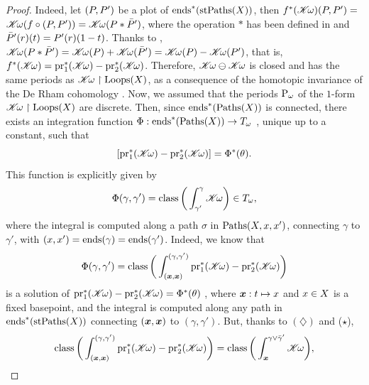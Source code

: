 \begin{proof}
  Indeed,
  let $(\P,\P')$ be a plot of $\ends^*(\stPaths(\X))$,
  then $f^*(\CHK\!\omega)(\P,\P') =$%
  \linebreak%
  $\CHK\!\omega(f\circ(\P,\P')) = \CHK\!\omega(\P * \bar\P')$,
  where the operation $*$ has been defined in  and $\bar\P'(r)(t) = \P'(r)(1-t)$.
  Thanks to ,
  $\CHK\!\omega(\P * \bar\P') = \CHK\!\omega(\P) + \CHK\!\omega(\bar\P') = \CHK\!\omega(\P) - \CHK\!\omega(\P')$,
  that is,
  $f^*(\CHK\!\omega) = \pr_1^*(\CHK\!\omega) - \pr_2^*(\CHK\!\omega)$.
  Therefore,
  $\CHK\!\omega \ominus \CHK\!\omega$ is closed and has the same periods as $\CHK\!\omega \restriction \Loops(\X)$,
  as a consequence of the homotopic invariance of the De Rham cohomology .
  Now,
  we assumed that the periods $\Periods_\omega$ of the $1$-form $\CHK\!\omega \restriction \Loops(\X)$ are discrete.
  Then,
  since $\ends^*(\Paths(\X))$ is connected,
  there exists an integration function $\Phi : \ends^*(\Paths(\X)) \to \T_\omega$ ,
  unique up to a constant,
  such that
  $$%
  \left[\pr_1^*(\CHK\!\omega) - \pr_2^*(\CHK\!\omega)\right] = \Phi^*(\theta).
  $$%
  This function is explicitly given by
  \begin{equation}
    \renewcommand{\theequation}{$\spadesuit$}
    \Phi(\gamma,\gamma') = \class\bigg(\int_{\gamma'}^{\gamma} \CHK\!\omega\bigg) \in \Torus_\omega,
  \end{equation}
  where the integral is computed along a path $\sigma$ in $\Paths(\X,x,x')$,
  connecting $\gamma$ to $\gamma'$, with $(x,x') = \ends(\gamma) = \ends(\gamma')$.
  Indeed, we know that
  $$%
  \Phi(\gamma,\gamma') =
  \class\bigg(\int_{(\bmx, \bmx)}^{(\gamma, \gamma')}
  \pr_1^*(\CHK\!\omega) - \pr_2^*(\CHK\!\omega)\bigg)
  $$%
  is a solution of $\pr_1^*(\CHK\!\omega) - \pr_2^*(\CHK\!\omega) = \Phi^*(\theta)$
  ,
  where $\bmx : t \mapsto x$ and $x \in \X$ is a fixed basepoint,
  and the integral is computed along any path in $\ends^*(\stPaths(\X))$ connecting $(\bmx, \bmx)$ to $(\gamma,\gamma')$.
  But,
  thanks to $(\diamondsuit)$ and ($\star$),
  $$%
  \class\bigg(\int_{(\bmx, \bmx)}^{(\gamma, \gamma')} \pr_1^*(\CHK\!\omega) - \pr_2^*(\CHK\!\omega)\bigg)
  = \class\bigg(\int_\bmx^{\gamma \vee \bar\gamma'} \CHK\!\omega\bigg),
$$
\end{proof}
